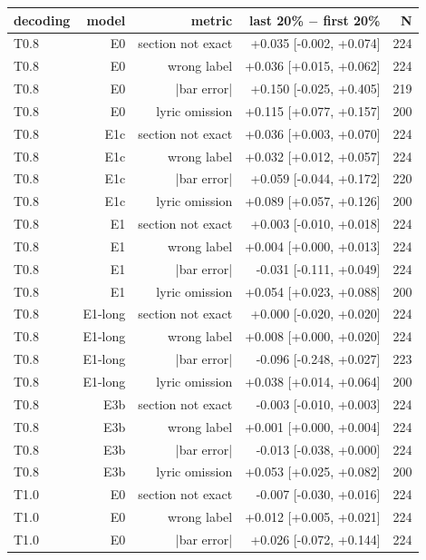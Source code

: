 \begin{table}[t]
\centering
\small
\begin{tabular}{lrrrr}
\toprule
decoding & model & metric & last 20\% $-$ first 20\% & N \\
\midrule
T0.8 & E0 & section not exact & +0.035 [-0.002, +0.074] & 224 \\
T0.8 & E0 & wrong label & +0.036 [+0.015, +0.062] & 224 \\
T0.8 & E0 & |bar error| & +0.150 [-0.025, +0.405] & 219 \\
T0.8 & E0 & lyric omission & +0.115 [+0.077, +0.157] & 200 \\
T0.8 & E1c & section not exact & +0.036 [+0.003, +0.070] & 224 \\
T0.8 & E1c & wrong label & +0.032 [+0.012, +0.057] & 224 \\
T0.8 & E1c & |bar error| & +0.059 [-0.044, +0.172] & 220 \\
T0.8 & E1c & lyric omission & +0.089 [+0.057, +0.126] & 200 \\
T0.8 & E1 & section not exact & +0.003 [-0.010, +0.018] & 224 \\
T0.8 & E1 & wrong label & +0.004 [+0.000, +0.013] & 224 \\
T0.8 & E1 & |bar error| & -0.031 [-0.111, +0.049] & 224 \\
T0.8 & E1 & lyric omission & +0.054 [+0.023, +0.088] & 200 \\
T0.8 & E1-long & section not exact & +0.000 [-0.020, +0.020] & 224 \\
T0.8 & E1-long & wrong label & +0.008 [+0.000, +0.020] & 224 \\
T0.8 & E1-long & |bar error| & -0.096 [-0.248, +0.027] & 223 \\
T0.8 & E1-long & lyric omission & +0.038 [+0.014, +0.064] & 200 \\
T0.8 & E3b & section not exact & -0.003 [-0.010, +0.003] & 224 \\
T0.8 & E3b & wrong label & +0.001 [+0.000, +0.004] & 224 \\
T0.8 & E3b & |bar error| & -0.013 [-0.038, +0.000] & 224 \\
T0.8 & E3b & lyric omission & +0.053 [+0.025, +0.082] & 200 \\
T1.0 & E0 & section not exact & -0.007 [-0.030, +0.016] & 224 \\
T1.0 & E0 & wrong label & +0.012 [+0.005, +0.021] & 224 \\
T1.0 & E0 & |bar error| & +0.026 [-0.072, +0.144] & 224 \\

\end{tabular}
\end{table}
